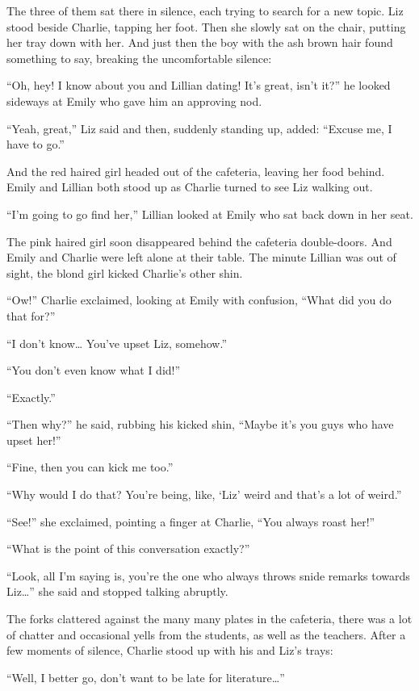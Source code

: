 The three of them sat there in silence, each trying to search for a new topic. Liz stood beside Charlie, tapping her foot. Then she slowly sat on the chair, putting her tray down with her. And just then the boy with the ash brown hair found something to say, breaking the uncomfortable silence:

“Oh, hey! I know about you and Lillian dating! It's great, isn't it?” he looked sideways at Emily who gave him an approving nod.

“Yeah, great,” Liz said and then, suddenly standing up, added: “Excuse me, I have to go.”

And the red haired girl headed out of the cafeteria, leaving her food behind. Emily and Lillian both stood up as Charlie turned to see Liz walking out.

“I'm going to go find her,” Lillian looked at Emily who sat back down in her seat.

The pink haired girl soon disappeared behind the cafeteria double-doors. And Emily and Charlie were left alone at their table. The minute Lillian was out of sight, the blond girl kicked Charlie's other shin.

“Ow!” Charlie exclaimed, looking at Emily with confusion, “What did you do that for?”

“I don't know… You've upset Liz, somehow.”

“You don't even know what I did!”

“Exactly.”

“Then why?” he said, rubbing his kicked shin, “Maybe it's you guys who have upset her!”

“Fine, then you can kick me too.”

“Why would I do that? You're being, like, ‘Liz' weird and that's a lot of weird.”

“See!” she exclaimed, pointing a finger at Charlie, “You always roast her!”

“What is the point of this conversation exactly?”

“Look, all I'm saying is, you're the one who always throws snide remarks towards Liz…” she said and stopped talking abruptly.

The forks clattered against the many many plates in the cafeteria, there was a lot of chatter and occasional yells from the students, as well as the teachers. After a few moments of silence, Charlie stood up with his and Liz's trays:

“Well, I better go, don't want to be late for literature…”

